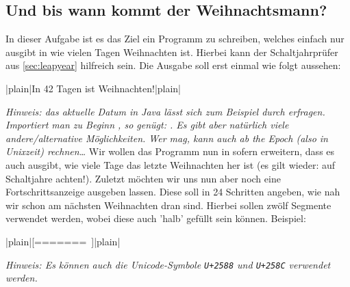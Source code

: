 \documentclass[table]{sopra-base}
\let\T\texttt
\begin{document}
\subsection{Und bis wann kommt der Weihnachtsmann?}

In dieser Aufgabe ist es das Ziel ein Programm zu schreiben, welches einfach nur ausgibt in wie vielen Tagen Weihnachten ist. Hierbei kann der Schaltjahrprüfer aus \ref{sec:leapyear} hilfreich sein. Die Ausgabe soll erst einmal wie folgt aussehen:
\begin{plainvoid}
|plain|In 42 Tagen ist Weihnachten!|plain|
\end{plainvoid}
\textit{Hinweis: das aktuelle Datum in Java lässt sich zum Beispiel durch  erfragen. Importiert man zu Beginn , so genügt: . Es gibt aber natürlich viele andere/alternative Möglichkeiten. Wer mag, kann auch ab \emph{the Epoch} (also in Unixzeit) rechnen\ldots}
Wir wollen das Programm nun in sofern erweitern, dass es auch ausgibt, wie viele Tage das letzte Weihnachten her ist (es gilt wieder: auf Schaltjahre achten!).
Zuletzt möchten wir uns nun aber noch eine Fortschrittsanzeige ausgeben lassen. Diese soll in 24 Schritten angeben, wie nah wir schon am nächsten Weihnachten dran sind. Hierbei sollen
zwölf Segmente verwendet werden, wobei diese auch 'halb' gefüllt sein können. Beispiel:
\begin{plainvoid}
|plain|[=======\    ]|plain|
\end{plainvoid}
\textit{Hinweis: Es können auch die Unicode-Symbole \T{U+2588} und \T{U+258C} verwendet werden.}
\end{document}
